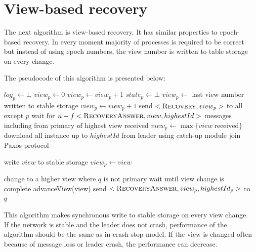 \section{View-based recovery}
\label{sec:view_ss}

The next algorithm is view-based recovery. It has similar properties to epoch-based recovery. In every moment majority of processes is required to be correct but instead of using epoch numbers, the view number is written to table storage on every change. 

The pseudocode of this algorithm is presented below: 

\begin{algorithmic}[1]
  \INIT{}
    \STATE $log_p \leftarrow \bot$
    \STATE $view_p \leftarrow 0$
      \STATE $view_p \leftarrow view_p + 1$
    \ENDIF
    \STATE $state_p \leftarrow \bot$
    \STATE
      \STATE $view_p \leftarrow$ last view number written to stable storage
        \STATE $view_p \leftarrow view_p + 1$
      \ENDIF
      \STATE send $<\recovery[], view_p>$ to all except $p$
      \STATE wait for $n-f <\recoveryAnswer[], view, highestId>$ messages including from primary of highest view received
      \STATE $view_p \leftarrow \max\{{ view \; \mathrm{received}}\}$
      \STATE download all instance up to $highestId$ from leader using catch-up module
    \ENDIF
    \STATE
    \STATE join Paxos protocol
  \ENDINIT

  \vspace{1em}
    \STATE write $view$ to stable storage
    \STATE $view_p \leftarrow view$
  \ENDPROC

  \vspace{1em}
      \STATE change to a higher view where $q$ is not primary
      \STATE wait until view change is complete
    \ENDIF
      \STATE advanceView(view)
    \ENDIF
    \STATE send $<\recoveryAnswer[], view_p, highestId_p>$ to $q$
  \ENDUPON
\end{algorithmic}

This algorithm makes synchronous write to stable storage on every view change. \linebreak If the network is stable and the leader does not crash, performance of the algorithm should be the same as in crash-stop model. If the view is changed often because of message loss or leader crash, the performance can decrease.

